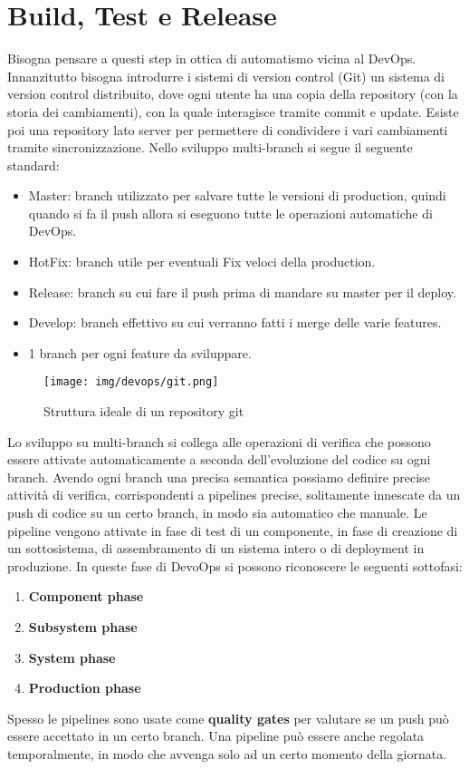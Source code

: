 \section{Build, Test e Release}
Bisogna pensare a questi step in ottica di automatismo vicina al DevOps.
Innanzitutto bisogna introdurre i sistemi di version control (Git) un sistema di
version control distribuito, dove ogni utente ha una copia della repository
(con la storia dei cambiamenti), con la quale interagisce tramite commit e update.
Esiste poi una repository lato server per permettere di condividere i vari
cambiamenti tramite sincronizzazione. Nello sviluppo multi-branch si segue il
seguente standard:
\begin{itemize}
      \item Master: branch utilizzato per salvare tutte le versioni di production,
            quindi quando si fa il push allora si eseguono tutte le operazioni
            automatiche di DevOps.
      \item HotFix: branch utile per eventuali Fix veloci della production.
      \item Release: branch su cui fare il push prima di mandare su master per
            il deploy.
      \item Develop: branch effettivo su cui verranno fatti i merge delle
            varie features.
      \item 1 branch per ogni feature da sviluppare.
\end{itemize}
\begin{figure}[!ht]
      \centering
      \texttt{[image: img/devops/git.png]}
      \caption{Struttura ideale di un repository git}
      \label{fig:git}
\end{figure}
Lo sviluppo su multi-branch si collega alle operazioni di verifica che possono
essere attivate automaticamente a seconda dell'evoluzione del codice su ogni branch.
Avendo ogni branch una precisa semantica possiamo definire precise attività di
verifica, corrispondenti a pipelines precise, solitamente innescate da un push di
codice su un certo branch, in modo sia automatico che manuale.
Le pipeline vengono attivate in fase di test di un componente, in fase di creazione
di un sottosistema, di assembramento di un sistema intero o di deployment in
produzione. In queste fase di DevoOps si possono riconoscere le seguenti sottofasi:
\begin{enumerate}
      \item \textbf{Component phase}
      \item \textbf{Subsystem phase}
      \item \textbf{System phase}
      \item \textbf{Production phase}
\end{enumerate}
Spesso le pipelines sono usate come \textbf{quality gates} per valutare se un push
può essere accettato in un certo branch. Una pipeline può essere anche regolata
temporalmente, in modo che avvenga solo ad un certo momento della giornata.
